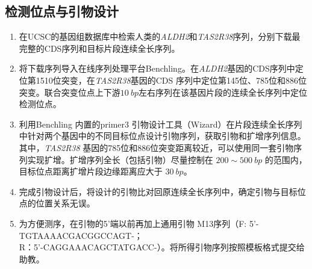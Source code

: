 \documentclass[10pt]{article}
\begin{document}
\subsection{检测位点与引物设计}
\begin{enumerate}
    \item 在UCSC的基因组数据库中检索人类的\textit{ALDH2}和\textit{TAS2R38}序列，分别下载最完整的CDS序列和目标片段连续全长序列。
    \item 将下载序列导入在线序列处理平台Benchling。在\textit{ALDH2}基因的CDS序列中定位第1510位突变，在\textit{TAS2R38}基因的CDS 序列中定位第145位、785位和886位突变。联合突变位点上下游$\qty{10}{bp}$左右序列在该基因片段的连续全长序列中定位检测位点。
    \item 利用Benchling 内置的primer3 引物设计工具（Wizard）在片段连续全长序列中针对两个基因中的不同目标位点设计引物序列，获取引物和扩增序列信息。其中，\textit{TAS2R38} 基因的785位和886位突变距离较近，可以使用同一套引物序列实现扩增。扩增序列全长（包括引物）尽量控制在 $200\sim\qty{500}{bp}$ 的范围内，目标位点距离扩增片段边缘距离应大于 $\qty{30}{bp}$。
    \item 完成引物设计后，将设计的引物比对回原连续全长序列中，确定引物与目标位点的位置关系无误。
    \item 为方便测序，在引物的5’端以前再加上通用引物 M13序列（F: 5’-TGTAAAACGACGGCCAGT-；\\ R：5’-CAGGAAACAGCTATGACC-）。将所得引物序列按照模板格式提交给助教。
\end{enumerate}
\end{document}
